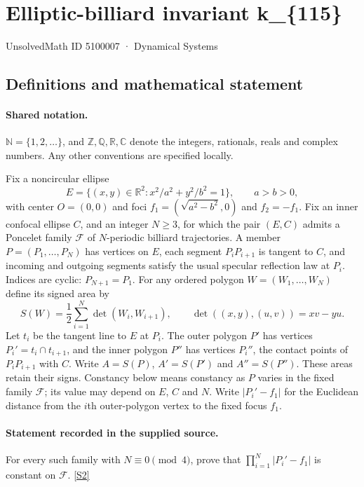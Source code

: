 \documentclass[11pt]{article}
\newcommand{\sref}[2]{\hyperlink{source:#1:#2}{[S#2]}}
\begin{document}
\setcounter{section}{5100006}
\section{Elliptic-billiard invariant k\_\{115\}}\label{5100007}
{\small\sffamily UnsolvedMath ID 5100007 · Dynamical Systems}
\subsection{Definitions and mathematical statement}

\paragraph{Shared notation.}$\mathbb N=\{1,2,\ldots\}$, and $\mathbb Z,\mathbb Q,\mathbb R,\mathbb C$ denote the integers, rationals, reals and complex numbers. Any other conventions are specified locally.


Fix a noncircular ellipse
\[
E=\{(x,y)\in\mathbb R^2:x^2/a^2+y^2/b^2=1\},\qquad a>b>0,
\]
with center $O=(0,0)$ and foci $f_1=(\sqrt{a^2-b^2},0)$ and $f_2=-f_1$. Fix an inner confocal ellipse $C$, and an integer $N\geq3$, for which the pair $(E,C)$ admits a Poncelet family $\mathcal F$ of $N$-periodic billiard trajectories. A member $P=(P_1,\ldots,P_N)$ has vertices on $E$, each segment $P_iP_{i+1}$ is tangent to $C$, and incoming and outgoing segments satisfy the usual specular reflection law at $P_i$. Indices are cyclic: $P_{N+1}=P_1$.
For any ordered polygon $W=(W_1,\ldots,W_N)$ define its signed area by
\[
S(W)=\frac12\sum_{i=1}^N\det(W_i,W_{i+1}),\qquad
\det((x,y),(u,v))=xv-yu.
\]
Let $t_i$ be the tangent line to $E$ at $P_i$. The outer polygon $P'$ has vertices $P_i'=t_i\cap t_{i+1}$, and the inner polygon $P''$ has vertices $P_i''$, the contact points of $P_iP_{i+1}$ with $C$. Write $A=S(P)$, $A'=S(P')$ and $A''=S(P'')$. These areas retain their signs. Constancy below means constancy as $P$ varies in the fixed family $\mathcal F$; its value may depend on $E$, $C$ and $N$.
Write $|P_i'-f_1|$ for the Euclidean distance from the $i$th outer-polygon vertex to the fixed focus $f_1$.
\paragraph{Statement recorded in the supplied source.}
For every such family with $N\equiv0\pmod4$, prove that $\displaystyle\prod_{i=1}^N|P_i'-f_1|$ is constant on $\mathcal F$. \sref{5100007}{2}
\end{document}
